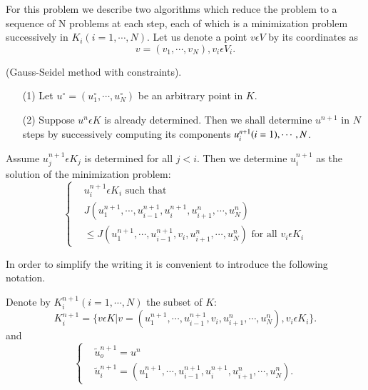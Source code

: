 For this problem we describe two algorithms which reduce the problem to a sequence of N problems at each step, each of which is a minimization problem successively in $K_{i} (i = 1, \cdots, N)$. Let us denote a point $v \epsilon V$ by its coordinates as
$$
v = (v_{1}, \cdots, v_{N}), v_{i} \epsilon V_{i}.
$$

\medskip
{} (Gauss-Seidel method with constraints).
\begin{enumerate}
\item[(1)] Let $u^{\circ} = (u_{1}^{\circ}, \cdots, u_{N}^{\circ})$ be an arbitrary point in $K$.

\item[(2)] Suppose $u^{n} \epsilon K$ is already determined. Then we
  shall determine $u^{n+1}$ in $N$ steps by successively computing its
  components $u_{i}^{n+1}\break (i=1), \cdots , N$. 
\end{enumerate}

Assume $u_{j}^{n+1} \epsilon K_{j}$ is determined for all $j < i$. Then we determine $u_{i}^{n+1}$ as the solution of the minimization problem:
\begin{equation*}
\begin{cases}
& u_{i}^{n+1} \epsilon K_{i} \text{ such that }\\
& J(u_{1}^{n+1}, \cdots, u_{i-1}^{n+1}, u_{i}^{n+1}, u_{i+1}^{n}, \cdots, u_{N}^{n})\\
& \leq J(u_{1}^{n+1}, \cdots, u_{i-1}^{n+1}, v_{i}, u_{i+1}^{n}, \cdots , u_{N}^{n}) \text{ for all } v_{i} \epsilon K_{i}\tag{4.2}\label{chap4-eq4.2}
\end{cases}
\end{equation*}

In order to simplify the writing it is convenient to introduce the following notation.

\medskip
{}\pageoriginale Denote by $K_{i}^{n+1} (i = 1, \cdots, N)$ the subset of $K$: 
\begin{equation*}
K_{i}^{n+1} = \{v \epsilon K | v = (u_{1}^{n+1}, \cdots, u_{i-1}^{n+1}, v_{i}, u_{i+1}^{n}, \cdots, u_{N}^{n}), v_{i} \epsilon K_{i}\}.\tag{4.3}\label{chap4-eq4.3}
\end{equation*}
and
\begin{equation*}
\begin{cases}
& \widetilde{u}_{o}^{n+1} = u^{n}\\
& \widetilde{u}_{i}^{n+1} = (u_{1}^{n+1}, \cdots, u_{i-1}^{n+1}, u_{i}^{n+1}, u_{i+1}^{n}, \cdots, u_{N}^{n}).\tag{4.4}\label{chap4-eq4.4}
\end{cases}
\end{equation*}

